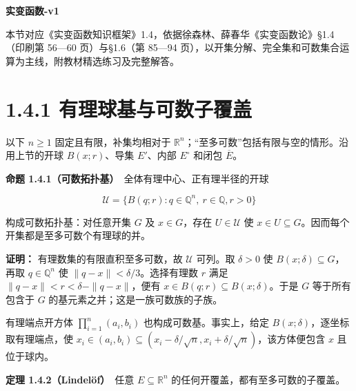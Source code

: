 \documentclass[11pt,a4paper]{article}
\begin{document}
\begin{center}
{\Large\bfseries 实变函数-v1\par}
\vspace{7pt}{\large 1.4 点集的结构\par}
\vspace{5pt}{第一章 集合与点集\par}
\end{center}
本节对应《实变函数知识框架》1.4，依据徐森林、薛春华《实变函数论》\S1.4（印刷第 56—60 页）与\S1.6（第 85—94 页），以开集分解、完全集和可数集合运算为主线，附教材精选练习及完整解答。
\begingroup\setlength{\parskip}{0pt}\tableofcontents\endgroup

\section[\S{}1.4.1
有理球基与可数子覆盖]{1.4.1
有理球基与可数子覆盖}\label{ux6709ux7406ux7403ux57faux4e0eux53efux6570ux5b50ux8986ux76d6}

以下 \(n\geq1\) 固定且有限，补集均相对于
\(\mathbb R^n\)；``至多可数''包括有限与空的情形。沿用上节的开球
\(B(x;r)\)、导集 \(E'\)、内部 \(E^\circ\) 和闭包 \(\overline E\)。

\textbf{命题 1.4.1（可数拓扑基）}　全体有理中心、正有理半径的开球

\begin{equation*}
\mathcal U=\{B(q;r):q\in\mathbb Q^n,\ r\in\mathbb Q, r>0\}
\tag{1.4.1}
\end{equation*}

构成可数拓扑基：对任意开集 \(G\) 及 \(x\in G\)，存在 \(U\in\mathcal U\)
使 \(x\in U\subseteq G\)。因而每个开集都是至多可数个有理球的并。

\textbf{证明：} 有理数集的有限直积至多可数，故 \(\mathcal U\) 可列。取
\(\delta>0\) 使 \(B(x;\delta)\subseteq G\)，再取 \(q\in\mathbb Q^n\) 使
\(\|q-x\|<\delta/3\)。选择有理数 \(r\) 满足
\(\|q-x\|<r<\delta-\|q-x\|\)，便有
\(x\in B(q;r)\subseteq B(x;\delta)\)。于是 \(G\) 等于所有包含于 \(G\)
的基元素之并；这是一族可数族的子族。

有理端点开方体 \(\prod_{i=1}^n(a_i,b_i)\) 也构成可数基。事实上，给定
\(B(x;\delta)\)，逐坐标取有理端点，使
\(x_i\in(a_i,b_i)\subseteq(x_i-\delta/\sqrt n,x_i+\delta/\sqrt n)\)，该方体便包含
\(x\) 且位于球内。

\textbf{定理 1.4.2（Lindelöf）}　任意 \(E\subseteq\mathbb R^n\)
的任何开覆盖，都有至多可数的子覆盖。
\end{document}
